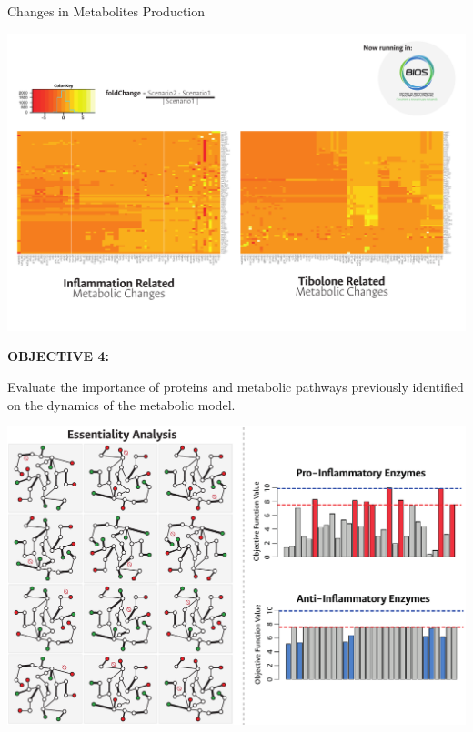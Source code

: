 \documentclass[11pt]{beamer}
\begin{document}
\begin{frame}{Changes in Metabolites Production}
\begin{center}
\includegraphics[width=\textwidth]{MetChanges}
\end{center}
\end{frame}
\begin{frame}
\begin{block}{\textbf{OBJECTIVE 4:}}
\begin{center}
Evaluate the importance of proteins and metabolic pathways previously identified on the dynamics of the metabolic model.\end{center}\end{block}
\end{frame}
\begin{frame}
\begin{center}
\includegraphics[width=\textwidth]{Networks}
\end{center}
\end{frame}
\end{document}
